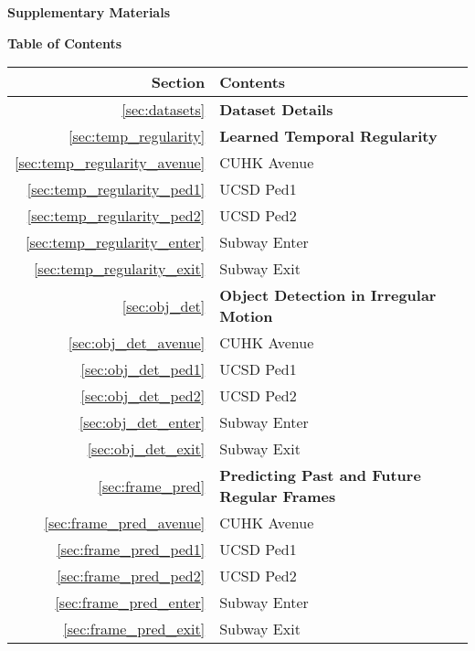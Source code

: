 \documentclass[10pt,twocolumn,letterpaper]{article}
\begin{document}
\clearpage
\onecolumn

\begin{center} 
{\bf \Large Supplementary Materials}
\end{center}
\vspace{1em}

\begin{center}
	{\bf \large Table of Contents}
\end{center}
\begin{table*}[h]
	\vspace{-5mm}
	\centering
	\begin{tabular}{|r|p{12cm}|}
		\hline
		Section & Contents\\
		\hline \hline \hline
		\ref{sec:datasets} & {\bf Dataset Details} \\
		\hline \hline
		\ref{sec:temp_regularity} & {\bf Learned Temporal Regularity} \\
		\hline
		\ref{sec:temp_regularity_avenue} & CUHK Avenue \\
		\hline
		\ref{sec:temp_regularity_ped1} & UCSD Ped1 \\
		\hline
		\ref{sec:temp_regularity_ped2} & UCSD Ped2\\
		\hline
		\ref{sec:temp_regularity_enter} & Subway Enter \\
		\hline
		\ref{sec:temp_regularity_exit} & Subway Exit \\
		\hline \hline
		 \ref{sec:obj_det} & {\bf Object Detection in Irregular Motion} \\
		\hline
		\ref{sec:obj_det_avenue} & CUHK Avenue\\
		\hline
		\ref{sec:obj_det_ped1} & UCSD Ped1 \\
		\hline
		\ref{sec:obj_det_ped2} & UCSD Ped2 \\
		\hline
		\ref{sec:obj_det_enter} & Subway Enter \\
		\hline
		\ref{sec:obj_det_exit} & Subway Exit \\
		\hline \hline
		\ref{sec:frame_pred} & {\bf Predicting Past and Future Regular Frames}  \\
		\hline
		\ref{sec:frame_pred_avenue} & CUHK Avenue\\
		\hline
		\ref{sec:frame_pred_ped1} & UCSD Ped1 \\
		\hline
		\ref{sec:frame_pred_ped2} & UCSD Ped2 \\
		\hline
		\ref{sec:frame_pred_enter} & Subway Enter \\
		\hline
		\ref{sec:frame_pred_exit} & Subway Exit \\

\end{tabular}
\end{table*}
\end{document}
